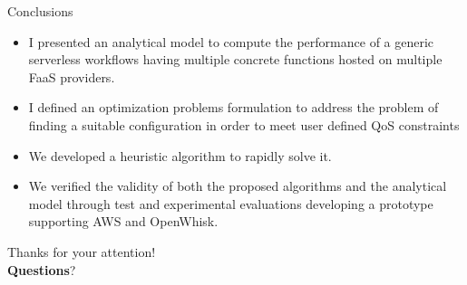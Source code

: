 \documentclass[13.5pt]{beamer}
\newcommand{\B}[1]{\textcolor{TorVergataColor}{\textbf{#1}}}
\begin{document}
\begin{frame}{Conclusions}

\begin{itemize}
	
	\item I presented an analytical model to compute the performance  of a generic serverless workflows having multiple concrete functions hosted on multiple FaaS providers. 
	\vspace{\baselineskip}
	\item I defined an optimization problems formulation to address the problem of finding a suitable configuration in order to meet user defined QoS constraints
	\vspace{\baselineskip}
	\item We developed a heuristic algorithm to rapidly solve it.
	\vspace{\baselineskip}
	\item We verified the validity of both the proposed algorithms and the analytical model through test and experimental evaluations developing a prototype supporting AWS and OpenWhisk.
	
\end{itemize}
\end{frame}


\begin{frame}{{}}
	\begin{block}{}
		\centering
		Thanks for your attention!\\\B{Questions}?
	\end{block}
\end{frame} 
\end{document}

